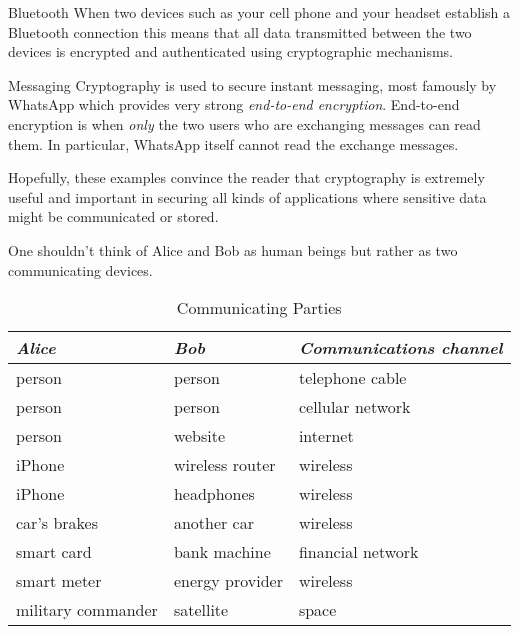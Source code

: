 \begin{Example}{Bluetooth}{}
    When two devices such as your cell phone and
    your headset establish a Bluetooth connection this means that all data
    transmitted between the two devices is encrypted and authenticated using
    cryptographic mechanisms.
\end{Example}
\begin{Example}{Messaging}{}
    Cryptography is used to secure instant messaging, most famously by WhatsApp which
    provides very strong \emph{end-to-end encryption}. End-to-end encryption
    is when \emph{only} the two users who are exchanging messages can read them. In particular,
    WhatsApp itself cannot read the exchange messages.
\end{Example}
Hopefully, these examples convince the reader that cryptography
is extremely useful and important in securing all kinds of applications
where sensitive data might be communicated or stored.

One shouldn't think of Alice and Bob as human beings but rather as two communicating devices.

\begin{table}[!ht]
    \caption{Communicating Parties}
    \begin{tabularx}{0.9\linewidth}{@{}YYY@{}}
        \toprule
        \emph{Alice}       & \emph{Bob}      & \emph{Communications channel} \\
        \midrule
        person             & person          & telephone cable               \\
        person             & person          & cellular network              \\
        person             & website         & internet                      \\
        iPhone             & wireless router & wireless                      \\
        iPhone             & headphones      & wireless                      \\
        car's brakes       & another car     & wireless                      \\
        smart card         & bank machine    & financial network             \\
        smart meter        & energy provider & wireless                      \\
        military commander & satellite       & space
    \end{tabularx}
\end{table}

